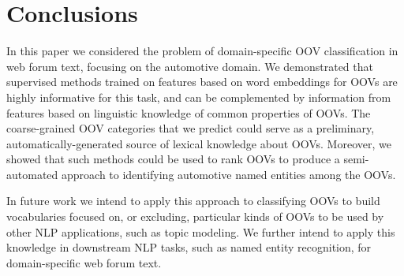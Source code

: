 \documentclass[10pt, a4paper]{article}
\begin{document}







\section{Conclusions}

In this paper we considered the problem of domain-specific OOV
classification in web forum text, focusing on the automotive
domain. We demonstrated that supervised methods trained on features
based on word embeddings for OOVs are highly informative for this
task, and can be complemented by information from features based on
linguistic knowledge of common properties of OOVs.  The coarse-grained
OOV categories that we predict could serve as a preliminary,
automatically-generated source of lexical knowledge about
OOVs. Moreover, we showed that such methods could be used to rank OOVs
to produce a semi-automated approach to identifying automotive named
entities among the OOVs.

In future work we intend to apply this approach to classifying OOVs to
build vocabularies focused on, or excluding, particular kinds of OOVs
to be used by other NLP applications, such as topic modeling. We
further intend to apply this knowledge in downstream NLP tasks, such
as named entity recognition, for domain-specific web forum text.

\end{document}
